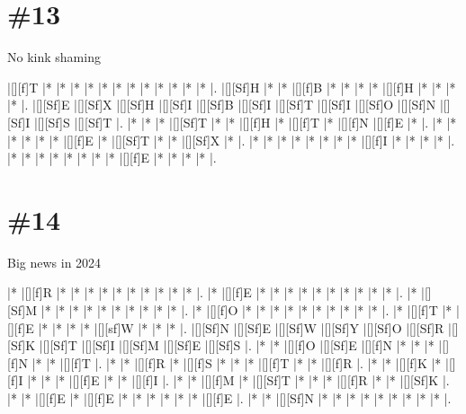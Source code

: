 \documentclass[letterpaper]{article}
\begin{document}
\section*{\#13}
No kink shaming

\vspace*{1em}
\begin{Puzzle}{13}{7}
|[][f]T   |*        |*        |*        |*        |*        |*        |*        |*        |*        |*        |*        |*        |.
|[][Sf]H  |*        |*        |[][f]B   |*        |*        |*        |*        |[][f]H   |*        |*        |*        |*        |.
|[][Sf]E  |[][Sf]X  |[][Sf]H  |[][Sf]I  |[][Sf]B  |[][Sf]I  |[][Sf]T  |[][Sf]I  |[][Sf]O  |[][Sf]N  |[][Sf]I  |[][Sf]S  |[][Sf]T  |.
|*        |*        |*        |[][Sf]T  |*        |*        |[][f]H   |*        |[][f]T   |*        |[][f]N   |[][f]E   |*        |.
|*        |*        |*        |*        |*        |*        |[][f]E   |*        |[][Sf]T  |*        |*        |[][Sf]X  |*        |.
|*        |*        |*        |*        |*        |*        |*        |*        |[][f]I   |*        |*        |*        |*        |.
|*        |*        |*        |*        |*        |*        |*        |*        |[][f]E   |*        |*        |*        |*        |.
\end{Puzzle}

\section*{\#14}
Big news in 2024

\vspace*{1em}
\begin{Puzzle}{12}{12}
|*        |[][f]R   |*        |*        |*        |*        |*        |*        |*        |*        |*        |*        |.
|*        |[][f]E   |*        |*        |*        |*        |*        |*        |*        |*        |*        |*        |.
|*        |[][Sf]M  |*        |*        |*        |*        |*        |*        |*        |*        |*        |*        |.
|*        |[][f]O   |*        |*        |*        |*        |*        |*        |*        |*        |*        |*        |.
|*        |[][f]T   |*        |[][f]E   |*        |*        |*        |*        |[][sf]W  |*        |*        |*        |.
|[][Sf]N  |[][Sf]E  |[][Sf]W  |[][Sf]Y  |[][Sf]O  |[][Sf]R  |[][Sf]K  |[][Sf]T  |[][Sf]I  |[][Sf]M  |[][Sf]E  |[][Sf]S  |.
|*        |*        |[][f]O   |[][Sf]E  |[][f]N   |*        |*        |*        |[][f]N   |*        |*        |[][f]T   |.
|*        |*        |[][f]R   |*        |[][f]S   |*        |*        |*        |[][f]T   |*        |*        |[][f]R   |.
|*        |*        |[][f]K   |*        |[][f]I   |*        |*        |*        |[][f]E   |*        |*        |[][f]I   |.
|*        |*        |[][f]M   |*        |[][Sf]T  |*        |*        |*        |[][f]R   |*        |*        |[][Sf]K  |.
|*        |*        |[][f]E   |*        |[][f]E   |*        |*        |*        |*        |*        |*        |[][f]E   |.
|*        |*        |[][Sf]N  |*        |*        |*        |*        |*        |*        |*        |*        |*        |.
\end{Puzzle}
\end{document}
